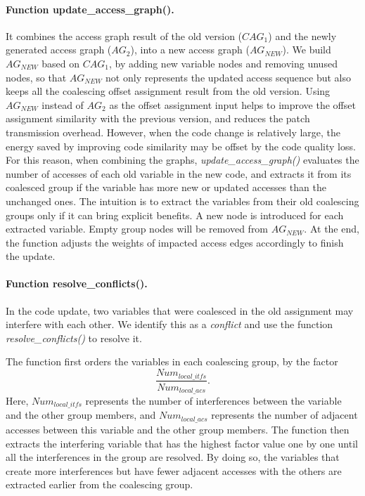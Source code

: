 \paragraph{Function  update\_access\_graph().} It combines the access graph result of the old version ($\textit{CAG}_1$) and the newly generated access graph ($\textit{AG}_2$), into a new access graph ($\textit{AG}_\textit{NEW}$).
We build $\textit{AG}_\textit{NEW}$ based on $\textit{CAG}_1$, by adding new variable nodes and removing unused nodes, so that
$\textit{AG}_\textit{NEW}$ not only represents the updated access sequence but also keeps all the coalescing offset assignment result from the old version.
Using $\textit{AG}_\textit{NEW}$ instead of $\textit{AG}_2$ as the offset assignment input helps to improve the offset assignment similarity with the previous version, and reduces the patch transmission overhead.
However, when the code change is relatively large, the energy saved by improving code similarity may be offset by the code quality loss. 
For this reason, when combining the graphs, {\it update\_access\_graph()} evaluates the number of accesses of each old variable in the new code, and extracts it from its coalesced group if the variable has more new or updated accesses than the unchanged ones. 
The intuition is to extract the variables from their old coalescing groups only if it can bring explicit benefits. 
A new node is introduced for each extracted variable. Empty group nodes will be removed from $\textit{AG}_\textit{NEW}$.
At the end, the function adjusts the weights of impacted access edges accordingly to finish the update.


\paragraph{Function resolve\_conflicts().}In the code update, two variables that were coalesced in the old assignment may interfere with each other. We identify this as a {\em conflict} and use the function {\it resolve\_conflicts()} to resolve it. 

The function first orders the variables in each coalescing group, by the factor 
$$\frac{\textit{Num}_{\textit{local}\_\textit{itfs}}}{\textit{Num}_{\textit{local}\_\textit{acs}}} .$$
Here, $\textit{Num}_{\textit{local}\_\textit{itfs}}$ represents the number of interferences between the variable and the other group members, and $\textit{Num}_{\textit{local}\_\textit{acs}}$ represents the number of adjacent accesses between this variable and the other group members. The function then extracts the interfering variable that has the highest factor value one by one until all the interferences in the group are resolved. By doing so, the variables that create more interferences but have fewer adjacent accesses with the others are extracted earlier from the coalescing group. 

